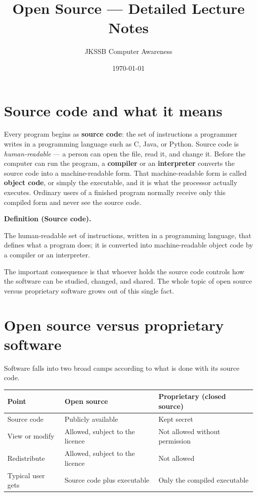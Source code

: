 \documentclass[11pt]{article}
\title{Open Source --- Detailed Lecture Notes}
\author{JKSSB Computer Awareness}
\date{\today}
\newenvironment{definitionbox}[1]{%
  \par\noindent\textbf{Definition (#1).}\ \itshape
}{\par\vspace{0.3em}}
\begin{document}
\maketitle

\section{Source code and what it means}
Every program begins as \textbf{source code}: the set of instructions a
programmer writes in a programming language such as C, Java, or Python. Source
code is \emph{human-readable} --- a person can open the file, read it, and
change it. Before the computer can run the program, a \textbf{compiler} or an
\textbf{interpreter} converts the source code into a machine-readable form.
That machine-readable form is called \textbf{object code}, or simply the
executable, and it is what the processor actually executes. Ordinary users of
a finished program normally receive only this compiled form and never see the
source code.

\begin{definitionbox}{Source code}
The human-readable set of instructions, written in a programming language,
that defines what a program does; it is converted into machine-readable
object code by a compiler or an interpreter.
\end{definitionbox}

The important consequence is that whoever holds the source code controls how
the software can be studied, changed, and shared. The whole topic of open
source versus proprietary software grows out of this single fact.

\section{Open source versus proprietary software}
Software falls into two broad camps according to what is done with its source
code.

\begin{center}
\begin{tabular}{p{}p{}p{}}
\toprule
\textbf{Point} & \textbf{Open source} & \textbf{Proprietary (closed source)} \\
\midrule
Source code & Publicly available & Kept secret \\
View or modify & Allowed, subject to the licence & Not allowed without permission \\
Redistribute & Allowed, subject to the licence & Not allowed \\
Typical user gets & Source code plus executable & Only the compiled executable \\
\bottomrule
\end{tabular}
\end{center}
\end{document}
